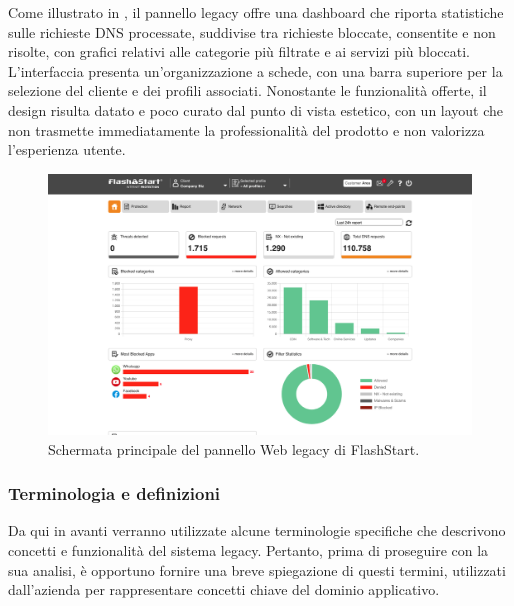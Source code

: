 Come illustrato in , il pannello legacy offre una dashboard che riporta statistiche sulle richieste DNS processate, suddivise tra richieste bloccate, consentite e non risolte, con grafici relativi alle categorie più filtrate e ai servizi più bloccati. L’interfaccia presenta un'organizzazione a schede, con una barra superiore per la selezione del cliente e dei profili associati.
%
Nonostante le funzionalità offerte, il design risulta datato e poco curato dal punto di vista estetico, con un layout che non trasmette immediatamente la professionalità del prodotto e non valorizza l’esperienza utente.

\begin{figure}
  \centering
  \includegraphics[width=1\textwidth]{figures/old-home.png}
  \caption{Schermata principale del pannello Web legacy di FlashStart.}
  \label{fig:flashstart-legacy}
\end{figure}

\subsubsection{Terminologia e definizioni}
Da qui in avanti verranno utilizzate alcune terminologie specifiche che descrivono concetti e funzionalità del sistema legacy. Pertanto, prima di proseguire con la sua analisi, è opportuno fornire una breve spiegazione di questi termini, utilizzati dall'azienda per rappresentare concetti chiave del dominio applicativo.


